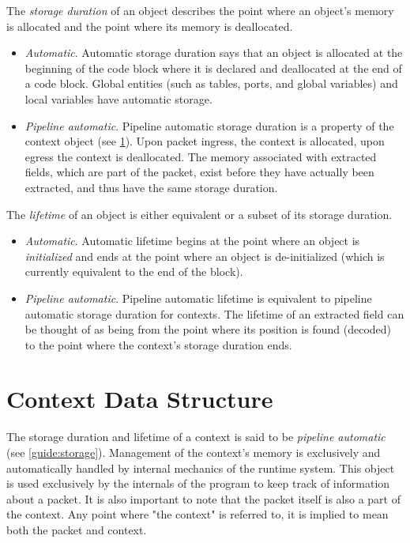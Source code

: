 The \textit{storage duration} of an object describes the point where an object's memory is allocated and the point where its memory is deallocated.

\begin{itemize}
\item \textit{Automatic}. Automatic storage duration says that an object is allocated at the beginning of the code block where it is declared and deallocated at the end of a code block. Global entities (such as tables, ports, and global variables) and local variables have automatic storage. 

\item \textit{Pipeline automatic}. Pipeline automatic storage duration is a property of the context object (see \ref{guide:context}). Upon packet ingress, the context is allocated, upon egress the context is deallocated. The memory associated with extracted fields, which are part of the packet, exist before they have actually been extracted, and thus have the same storage duration.
\end{itemize}

The \textit{lifetime} of an object is either equivalent or a subset of its storage duration.

\begin{itemize}
\item \textit{Automatic}. Automatic lifetime begins at the point where an object is \textit{initialized} and ends at the point where an object is de-initialized (which is currently equivalent to the end of the block).

\item \textit{Pipeline automatic}. Pipeline automatic lifetime is equivalent to pipeline automatic storage duration for contexts. The lifetime of an extracted field can be thought of as being from the point where its position is found (decoded) to the point where the context's storage duration ends.
\end{itemize}

\section{Context Data Structure} \label{guide:context}

The storage duration and lifetime of a context is said to be \textit{pipeline automatic} (see \ref{guide:storage}). Management of the context's memory is exclusively and automatically handled by internal mechanics of the runtime system. This object is used exclusively by the internals of the program to keep track of information about a packet. It is also important to note that the packet itself is also a part of the context. Any point where "the context" is referred to, it is implied to mean both the packet and context.

